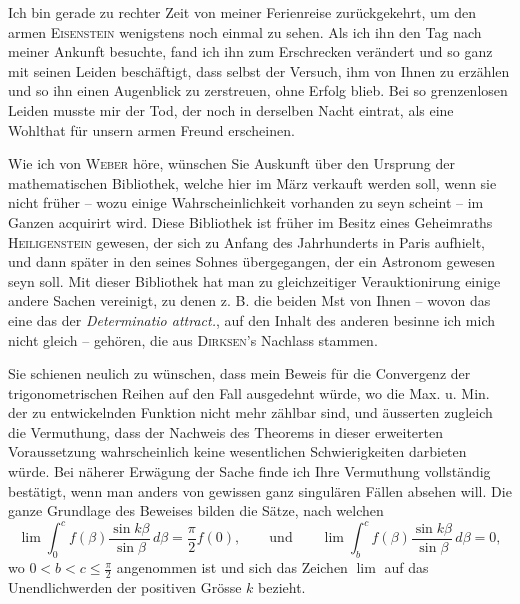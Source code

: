 \documentclass[11pt]{article}
\newcommand{\scn}[1]{\textsc{#1}}
\begin{document}
Ich bin gerade zu rechter Zeit von meiner Ferienreise zurückgekehrt, um den armen \scn{Eisenstein} wenigstens noch einmal zu sehen. Als ich ihn den Tag nach meiner Ankunft besuchte, fand ich ihn zum Erschrecken verändert und so ganz mit seinen Leiden beschäftigt, dass selbst der Versuch, ihm von Ihnen zu erzählen und so ihn einen Augenblick zu zerstreuen, ohne Erfolg blieb. Bei so grenzenlosen Leiden musste mir der Tod, der noch in derselben Nacht eintrat, als eine Wohlthat für unsern armen Freund erscheinen.

Wie ich von \scn{Weber} höre, wünschen Sie Auskunft über den Ursprung der mathematischen Bibliothek, welche hier im März verkauft werden soll, wenn sie nicht früher -- wozu einige Wahrscheinlichkeit vorhanden zu seyn scheint -- im Ganzen acquirirt wird. Diese Bibliothek ist früher im Besitz eines Geheimraths \scn{Heiligenstein} gewesen, der sich zu Anfang des Jahrhunderts in Paris aufhielt, und dann später in den seines Sohnes übergegangen, der ein Astronom gewesen seyn soll. Mit dieser Bibliothek hat man zu gleichzeitiger Verauktionirung einige andere Sachen vereinigt, zu denen z. B. die beiden Mst von Ihnen -- wovon das eine das der \emph{Determinatio attract.}, auf den Inhalt des anderen besinne ich mich nicht gleich -- gehören, die aus \scn{Dirksen}'s Nachlass stammen.

Sie schienen neulich zu wünschen, dass mein Beweis für die Convergenz der trigonometrischen Reihen auf den Fall ausgedehnt würde, wo die Max. u. Min. der zu entwickelnden Funktion nicht mehr zählbar sind, und äusserten zugleich die Vermuthung, dass der Nachweis des Theorems in dieser erweiterten Voraussetzung wahrscheinlich keine wesentlichen Schwierigkeiten darbieten würde. Bei näherer Erwägung der Sache finde ich Ihre Vermuthung vollständig bestätigt, wenn man anders von gewissen ganz singulären Fällen absehen will. Die ganze Grundlage des Beweises bilden die Sätze, nach welchen
\[
 \lim \int_0^c f(\beta)\frac{\sin k\beta}{\sin\beta}\,d\beta=\frac{\pi}{2}f(0),
 \qquad\text{und}\qquad
 \lim \int_b^c f(\beta)\frac{\sin k\beta}{\sin\beta}\,d\beta=0,
\]
wo $0<b<c\leq\frac\pi2$ angenommen ist und sich das Zeichen $\lim$ auf das Unendlichwerden der positiven Grösse $k$ bezieht.
\end{document}
